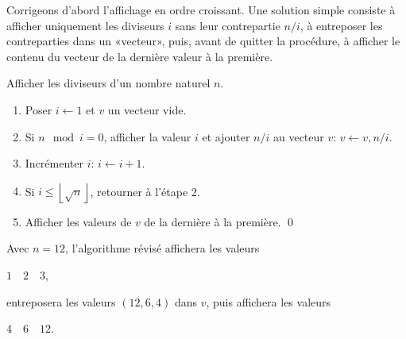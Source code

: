 \begin{exercice}
\begin{sol}
\begin{enumerate}
      Corrigeons d'abord l'affichage en ordre croissant. Une solution
      simple consiste à afficher uniquement les diviseurs $i$ sans
      leur contrepartie $n/i$, à entreposer les contreparties dans un
      «vecteur», puis, avant de quitter la procédure, à afficher le
      contenu du vecteur de la dernière valeur à la première. %
      \begingroup %
      \setcounter{algorithme}{2}
      \renewcommand{\thealgorithme}{\Alph{algorithme}'}
      \begin{algorithme}
        Afficher les diviseurs d'un nombre naturel $n$.
        \begin{enumerate}[1.]
        \item Poser $i \leftarrow 1$ et $v$ un vecteur vide.
        \item Si $n \mod i = 0$, afficher la valeur $i$ et ajouter
          $n/i$ au vecteur $v$: $v \leftarrow v, n/i$.
        \item Incrémenter $i$: $i \leftarrow i + 1$.
        \item Si $i \leq \left\lfloor \sqrt{n} \right\rfloor$,
          retourner à l'étape 2.
        \item Afficher les valeurs de $v$ de la dernière à la
          première.
          \qed
        \end{enumerate}
      \end{algorithme}
      \endgroup %
      Avec $n = 12$, l'algorithme révisé affichera les valeurs
      \begin{center}
        $1\quad 2\quad 3$,
      \end{center}
      entreposera les valeurs $(12, 6, 4)$ dans $v$, puis affichera
      les valeurs
      \begin{center}
        $4\quad 6\quad 12$.
      \end{center}


\end{enumerate}
\end{sol}
\end{exercice}
